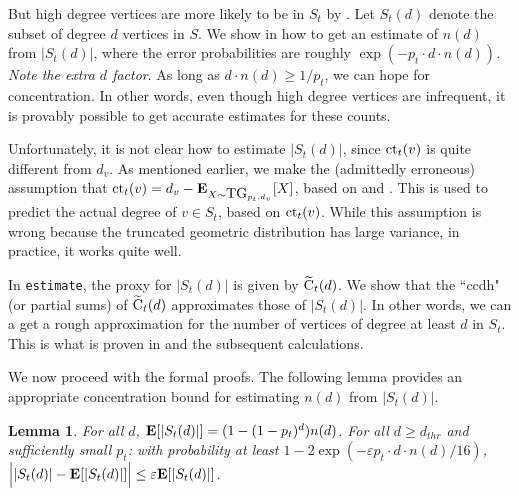 \documentclass[11pt]{article}
\newtheorem{lemma}[theorem]{Lemma}
\theoremstyle{definition}
\newcommand{\EX}{\hbox{\bf E}}
\def\eps{\varepsilon}
\newcommand{\tC}{\widetilde{\hbox{C}}}
\newcommand{\ct}{\hbox{ct}}
\newcommand{\tg}{\hbox{TG}}
\newcommand{\est}{{\tt estimate}}
\begin{document}
But high degree vertices are more likely to be in $S_t$ by .
Let $S_t(d)$ denote the subset of degree $d$ vertices in $S$.
We show in  how to get an estimate of $n(d)$ from $|S_t(d)|$,
where the error probabilities are roughly $\exp(-p_t\cdot d \cdot n(d))$.
\emph{Note the extra $d$ factor}. As long as $d\cdot n(d) \geq 1/p_t$, we can
hope for concentration. In other words, even though high degree vertices are infrequent,
it is provably possible to get accurate estimates for these counts.

Unfortunately, it is not clear how to estimate $|S_t(d)|$, since $\ct_t(v)$
is quite different from $d_v$. As mentioned earlier, we
make the (admittedly erroneous) assumption that $\ct_t(v) = d_v - \EX_{X \sim \tg_{p_t,d_v}}[X]$,
based on  and . This is used to predict the actual degree
of $v \in S_t$, based on $\ct_t(v)$. While this assumption is wrong because the truncated
geometric distribution has large variance, in practice, it works quite well.

In \est, the proxy for $|S_t(d)|$ is given by $\tC_t(d)$. We show
that the ``ccdh" (or partial sums) of $\tC_t(d)$ approximates those of $|S_t(d)|$.
In other words, we can a get a rough approximation for the number of vertices
of degree at least $d$ in $S_t$. This is what is proven in  and the subsequent calculations.

We now proceed with the formal proofs. The following lemma provides an appropriate concentration bound
for estimating $n(d)$ from $|S_t(d)|$.

\begin{lemma} \label{lem:highdeg} For all $d$, $\EX[|S_t(d)|] = (1-(1-p_t)^d)n(d)$. For all
$d \geq d_{thr}$ and sufficiently small $p_t$: with probability at least $1-2\exp(-\eps p_t\cdot d\cdot n(d)/16)$,
$\Big||S_t(d)| - \EX[|S_t(d)|]\Big| \leq \eps \EX[|S_t(d)|]$.
\end{lemma}
\end{document}
